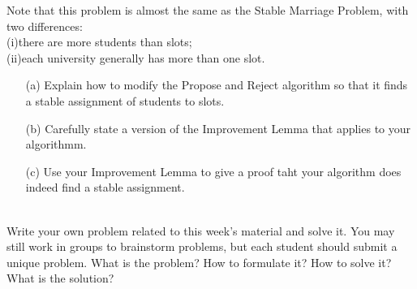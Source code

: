 \documentclass[11pt]{article}
\begin{document}
\begin{qunlist}
Note that this problem is almost the same as the Stable Marriage Problem, with two differences: \\
(i)there are more students than slots; \\
(ii)each university generally has more than one slot.

\begin{itemize}
\item[(a)] Explain how to modify the Propose and Reject algorithm so that it finds a stable assignment of students to slots.

\item[(b)] Carefully state a version of the Improvement Lemma that applies to your algorithmm.

\item[(c)] Use your Improvement Lemma to give a proof taht your algorithm does indeed find a stable assignment.

\end{itemize}











 \\

Write your own problem related to this week's material and solve it. You may still work in groups to brainstorm problems, but each student should submit a unique problem. What is the problem? How to formulate it? How to
solve it? What is the solution?


\end{qunlist}
\end{document}
